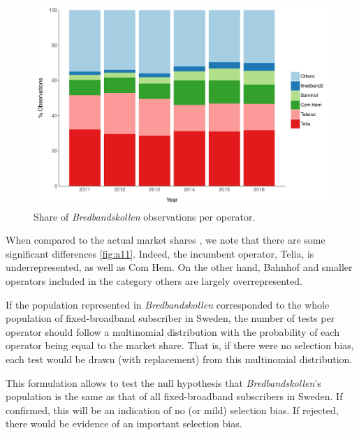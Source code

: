 \documentclass[12pt]{article}
\begin{document}
\vspace{0.5cm} 
\begin{figure}[H]
    \centering
        \includegraphics[width=\linewidth]{byoperator_barchart.pdf}
        \caption{Share of \textit{Bredbandskollen} observations per operator.}
        \label{fig:a10}
\end{figure}   

When compared to the actual market shares \citep{pts2016}, we note that there are some significant differences \autoref{fig:a11}. Indeed, the incumbent operator, Telia, is underrepresented, as well as Com Hem. On the other hand, Bahnhof and smaller operators included in the category others are largely overrepresented. 

If the population represented in \textit{Bredbandskollen} corresponded to the whole population of fixed-broadband subscriber in Sweden, the number of tests per operator should follow a multinomial distribution with the probability of each operator being equal to the market share. That is, if there were no selection bias, each test would be drawn (with replacement) from this multinomial distribution.

This formulation allows to test the null hypothesis that \textit{Bredbandskollen}'s population is the same as that of all fixed-broadband subscribers in Sweden. If confirmed, this will be an indication of no (or mild) selection bias. If rejected, there would be evidence of an important selection bias.  
\end{document}
